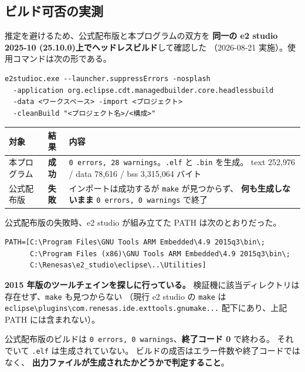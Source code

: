 \documentclass[a4paper,11pt,dvipdfmx]{jsarticle}
\newcommand{\ideversion}{2025-10 (25.10.0)}
\begin{document}
\subsection{ビルド可否の実測}\label{sec:kit20build}

推定を避けるため、公式配布版と本プログラムの双方を
\textbf{同一の e2 studio \ideversion 上でヘッドレスビルド}して確認した
（2026-08-21 実施）。使用コマンドは次の形である。

\begin{lstlisting}[caption={ヘッドレスビルドの実行},label=lst:headless]
e2studioc.exe --launcher.suppressErrors -nosplash
  -application org.eclipse.cdt.managedbuilder.core.headlessbuild
  -data <ワークスペース> -import <プロジェクト>
  -cleanBuild "<プロジェクト名>/<構成>"
\end{lstlisting}

\begin{tabularx}{\textwidth}{l l X}
\toprule
\textbf{対象} & \textbf{結果} & \textbf{内容} \\
\midrule
本プログラム & \textbf{成功} &
  \texttt{0 errors, 28 warnings}。\texttt{.elf} と \texttt{.bin} を生成。
  text 252{,}976 / data 78{,}616 / bss 3{,}315{,}064 バイト \\
公式配布版 & \textbf{失敗} &
  インポートは成功するが \texttt{make} が見つからず、
  \textbf{何も生成しないまま} \texttt{0 errors, 0 warnings} で終了 \\
\bottomrule
\end{tabularx}

\vspace{2mm}
公式配布版の失敗時、e2 studio が組み立てた PATH は次のとおりだった。

\begin{lstlisting}[caption={公式配布版のビルド時に参照された PATH},label=lst:kit20path]
PATH=[C:\Program Files\GNU Tools ARM Embedded\4.9 2015q3\bin\;
      C:\Program Files (x86)\GNU Tools ARM Embedded\4.9 2015q3\bin\;
      C:\Renesas\e2_studio\eclipse\..\Utilities]
\end{lstlisting}

\textbf{2015 年版のツールチェインを探しに行っている。}
検証機に該当ディレクトリは存在せず、\texttt{make} も見つからない
（現行 e2 studio の \texttt{make} は
\texttt{eclipse\textbackslash plugins\textbackslash com.renesas.ide.exttools.gnumake...}
配下にあり、上記 PATH には含まれない）。

\begin{cautionbox}
公式配布版のビルドは \texttt{0 errors, 0 warnings}、\textbf{終了コード 0} で終わる。
それでいて \texttt{.elf} は生成されていない。
ビルドの成否はエラー件数や終了コードではなく、
\textbf{出力ファイルが生成されたかどうかで判定すること}。
\end{cautionbox}
\end{document}
